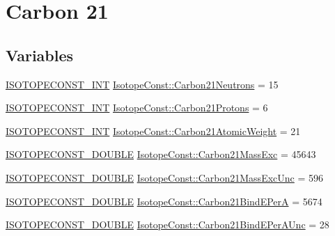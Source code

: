 \hypertarget{group___isotope_const-_carbon-_c21}{}\section{Carbon 21}
\label{group___isotope_const-_carbon-_c21}
\subsection*{Variables}
\begin{DoxyCompactItemize}
\item 
\mbox{\hyperlink{group___isotope_const-_macros_ga5f18360b3e99483a35c32d789e62621c}{I\+S\+O\+T\+O\+P\+E\+C\+O\+N\+S\+T\+\_\+\+I\+NT}} \mbox{\hyperlink{group___isotope_const-_carbon-_c21_ga3f197009ca06503c2da7717eade2d0a9}{Isotope\+Const\+::\+Carbon21\+Neutrons}} = 15
\item 
\mbox{\hyperlink{group___isotope_const-_macros_ga5f18360b3e99483a35c32d789e62621c}{I\+S\+O\+T\+O\+P\+E\+C\+O\+N\+S\+T\+\_\+\+I\+NT}} \mbox{\hyperlink{group___isotope_const-_carbon-_c21_ga0963c93fa59495ab84a9d92ea5ed0674}{Isotope\+Const\+::\+Carbon21\+Protons}} = 6
\item 
\mbox{\hyperlink{group___isotope_const-_macros_ga5f18360b3e99483a35c32d789e62621c}{I\+S\+O\+T\+O\+P\+E\+C\+O\+N\+S\+T\+\_\+\+I\+NT}} \mbox{\hyperlink{group___isotope_const-_carbon-_c21_gac0f16ab5c05423b48a9c81c231a03a10}{Isotope\+Const\+::\+Carbon21\+Atomic\+Weight}} = 21
\item 
\mbox{\hyperlink{group___isotope_const-_macros_ga8f45a7272ce02c0b4c65c44636ed719a}{I\+S\+O\+T\+O\+P\+E\+C\+O\+N\+S\+T\+\_\+\+D\+O\+U\+B\+LE}} \mbox{\hyperlink{group___isotope_const-_carbon-_c21_ga6e873facbb83896895b0452c8f63fe9f}{Isotope\+Const\+::\+Carbon21\+Mass\+Exc}} = 45643
\item 
\mbox{\hyperlink{group___isotope_const-_macros_ga8f45a7272ce02c0b4c65c44636ed719a}{I\+S\+O\+T\+O\+P\+E\+C\+O\+N\+S\+T\+\_\+\+D\+O\+U\+B\+LE}} \mbox{\hyperlink{group___isotope_const-_carbon-_c21_ga928e70998ac265903717b88dcd76cf7c}{Isotope\+Const\+::\+Carbon21\+Mass\+Exc\+Unc}} = 596
\item 
\mbox{\hyperlink{group___isotope_const-_macros_ga8f45a7272ce02c0b4c65c44636ed719a}{I\+S\+O\+T\+O\+P\+E\+C\+O\+N\+S\+T\+\_\+\+D\+O\+U\+B\+LE}} \mbox{\hyperlink{group___isotope_const-_carbon-_c21_ga785bc7e27630cfaa9b7b7ec874fb3872}{Isotope\+Const\+::\+Carbon21\+Bind\+E\+PerA}} = 5674
\item 
\mbox{\hyperlink{group___isotope_const-_macros_ga8f45a7272ce02c0b4c65c44636ed719a}{I\+S\+O\+T\+O\+P\+E\+C\+O\+N\+S\+T\+\_\+\+D\+O\+U\+B\+LE}} \mbox{\hyperlink{group___isotope_const-_carbon-_c21_ga87c90fed8aff619771f1d2e0581f74cd}{Isotope\+Const\+::\+Carbon21\+Bind\+E\+Per\+A\+Unc}} = 28

\end{DoxyCompactItemize}
